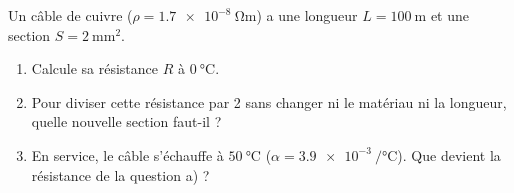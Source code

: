\documentclass[11pt,a4paper]{article}
\begin{document}
\begin{exo}
Un câble de cuivre ($\rho=\qty{1.7e-8}{\ohm\metre}$) a une longueur $L=\qty{100}{\metre}$ et une
section $S=\qty{2}{\milli\metre\squared}$.
\begin{enumerate}[label=\alph*)]
  \item Calcule sa résistance $R$ à $\qty{0}{\degreeCelsius}$.
  \item Pour diviser cette résistance par 2 sans changer ni le matériau ni la longueur, quelle
        nouvelle section faut-il ?
  \item En service, le câble s'échauffe à $\qty{50}{\degreeCelsius}$ ($\alpha=\qty{3.9e-3}{\per\degreeCelsius}$).
        Que devient la résistance de la question a) ?
\end{enumerate}
\end{exo}
\end{document}
